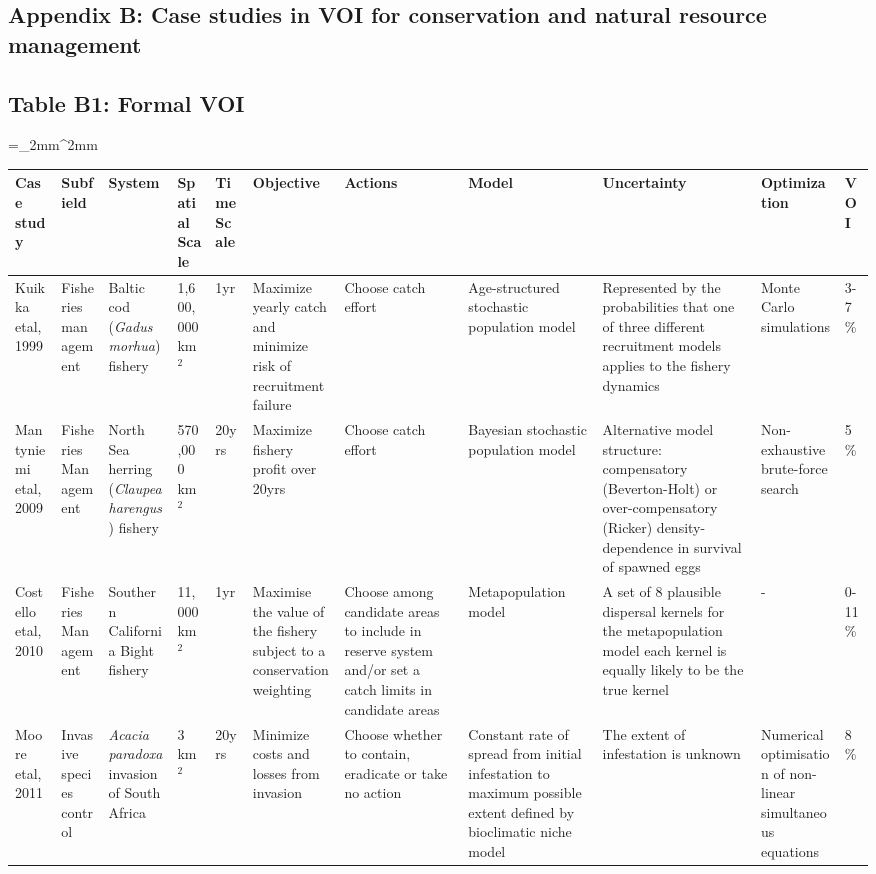 \documentclass[]{article}
\theoremstyle{definition}
\theoremstyle{definition}
\theoremstyle{definition}
\theoremstyle{remark}
\begin{document}
\newpage
\begin{landscape}
\section*{Appendix B: Case studies in VOI for conservation and natural resource management}

\subsection*{Table B1: Formal VOI}
\bgroup
\linespread{1}\scriptsize
\extrarowsep=_2mm^2mm
\begin{longtabu} to 230mm {|X[1,l] X[1,l] X[1,l] X[1,l] X[.8,l] X[1,l] X[1,l] X[1,l] X[1,l] X[1,l] X[1,l]|} \hline 
Case study & Subfield & System & Spatial Scale & Time Scale & Objective & Actions & Model & Uncertainty & Optimization & VOI \\ \hline
Kuikka etal, 1999 & Fisheries management & Baltic cod (\textit{Gadus morhua}) fishery & 1,600,000 km$^2$ & 1yr & Maximize yearly catch and minimize risk of recruitment failure & Choose catch effort & Age-structured stochastic population model & Represented by the probabilities that one of three different recruitment models applies to the fishery dynamics & Monte Carlo simulations & 3-7\% \\
Mantyniemi etal, 2009 & Fisheries Management & North Sea herring (\textit{Claupea harengus}) fishery & 570,000 km$^2$ & 20yrs & Maximize fishery profit over 20yrs & Choose catch effort & Bayesian stochastic population model & Alternative model structure: compensatory (Beverton-Holt) or over-compensatory (Ricker) density-dependence in survival of spawned eggs & Non-exhaustive brute-force search & 5\% \\
Costello etal, 2010 & Fisheries Management & Southern California Bight fishery & 11,000 km$^2$ & 1yr & Maximise the value of the fishery subject to a conservation weighting & Choose among candidate areas to include in reserve system and/or set a catch limits in candidate areas  & Metapopulation model & A set of 8 plausible dispersal kernels for the metapopulation model each kernel is equally likely to be the true kernel & - & 0-11\% \\
Moore etal, 2011 & Invasive species control & \textit{Acacia paradoxa} invasion of South Africa & 3 km$^2$ & 20yrs & Minimize costs and losses from invasion & Choose whether to contain, eradicate or take no action & Constant rate of spread from initial infestation to maximum possible extent defined by bioclimatic niche model & The extent of infestation is unknown & Numerical optimisation of non-linear simultaneous equations & 8\% \\

\end{longtabu}
\end{landscape}
\end{document}
